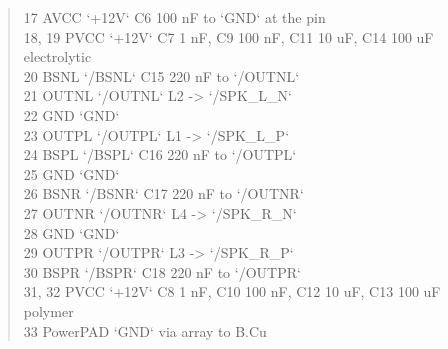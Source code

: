 \documentclass[11pt]{article}
\begin{document}
\begin{quote}
\textbar{} 17 \textbar{} AVCC \textbar{} `+12V` \textbar{} C6 100 nF to `GND` at the pin \textbar{}\\
\textbar{} 18, 19 \textbar{} PVCC \textbar{} `+12V` \textbar{} C7 1 nF, C9 100 nF, C11 10 uF, C14 100 uF electrolytic \textbar{}\\
\textbar{} 20 \textbar{} BSNL \textbar{} `/BSNL` \textbar{} C15 220 nF to `/OUTNL` \textbar{}\\
\textbar{} 21 \textbar{} OUTNL \textbar{} `/OUTNL` \textbar{} L2 -\textgreater{} `/SPK\_L\_N` \textbar{}\\
\textbar{} 22 \textbar{} GND \textbar{} `GND` \textbar{} \textbar{}\\
\textbar{} 23 \textbar{} OUTPL \textbar{} `/OUTPL` \textbar{} L1 -\textgreater{} `/SPK\_L\_P` \textbar{}\\
\textbar{} 24 \textbar{} BSPL \textbar{} `/BSPL` \textbar{} C16 220 nF to `/OUTPL` \textbar{}\\
\textbar{} 25 \textbar{} GND \textbar{} `GND` \textbar{} \textbar{}\\
\textbar{} 26 \textbar{} BSNR \textbar{} `/BSNR` \textbar{} C17 220 nF to `/OUTNR` \textbar{}\\
\textbar{} 27 \textbar{} OUTNR \textbar{} `/OUTNR` \textbar{} L4 -\textgreater{} `/SPK\_R\_N` \textbar{}\\
\textbar{} 28 \textbar{} GND \textbar{} `GND` \textbar{} \textbar{}\\
\textbar{} 29 \textbar{} OUTPR \textbar{} `/OUTPR` \textbar{} L3 -\textgreater{} `/SPK\_R\_P` \textbar{}\\
\textbar{} 30 \textbar{} BSPR \textbar{} `/BSPR` \textbar{} C18 220 nF to `/OUTPR` \textbar{}\\
\textbar{} 31, 32 \textbar{} PVCC \textbar{} `+12V` \textbar{} C8 1 nF, C10 100 nF, C12 10 uF, C13 100 uF polymer \textbar{}\\
\textbar{} 33 \textbar{} PowerPAD \textbar{} `GND` \textbar{} via array to B.Cu \textbar{}
\end{quote}
\end{document}
